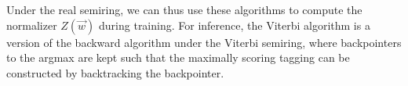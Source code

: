 Under the real semiring, we can thus use these algorithms to compute the
normalizer $Z(\vec{w})$ during training. For inference, the Viterbi algorithm
is a version of the backward algorithm under the Viterbi semiring, where
backpointers to the argmax are kept such that the maximally scoring tagging can
be constructed by backtracking the backpointer.
